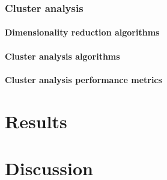 \documentclass[10pt]{article}\usepackage[]{graphicx}\usepackage[]{color}
\begin{document}
\clearpage
\section{Cluster analysis}

\subsection{Dimensionality reduction algorithms}

\subsection{Cluster analysis algorithms}

\subsection{Cluster analysis performance metrics}






\clearpage
\part{Results}





\clearpage
\part{Discussion}
\end{document}
